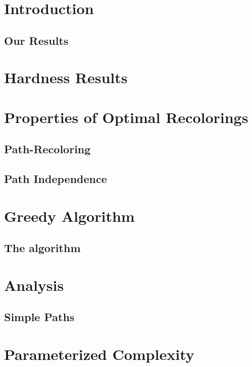 

\section{Introduction}

	
	\subsection{Our Results}
	

\section{Hardness Results}



\section{Properties of Optimal Recolorings}

	
	\subsection{Path-Recoloring}
	
	
	\subsection{Path Independence}
	


\section{Greedy Algorithm}


	\subsection{The algorithm}
	


\section{Analysis}


	\subsection{Simple Paths}
	

\section{Parameterized Complexity}
